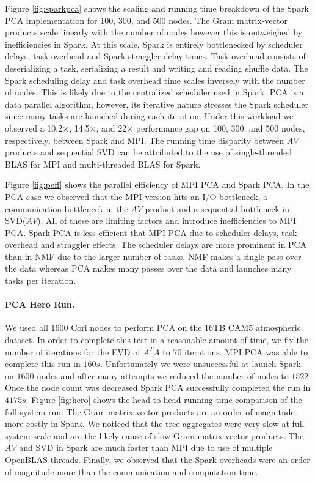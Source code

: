 Figure \ref{fig:sparkpca} shows the scaling and running time breakdown of the Spark PCA implementation for 100, 300, and 500 nodes. The Gram matrix-vector products scale linearly with the number of nodes however this is outweighed by inefficiencies in Spark. At this scale, Spark is entirely bottlenecked by scheduler delays, task overhead and Spark straggler delay times. Task overhead consists of deserializing a task, serializing a result and writing and reading shuffle data. The Spark scheduling delay and task overhead time scales inversely with the number of nodes. This is likely due to the centralized scheduler used in Spark. PCA is a data parallel algorithm, however, its iterative nature stresses the Spark scheduler since many tasks are launched during each iteration. Under this workload we observed a 10.2$\times$, 14.5$\times$, and 22$\times$ performance gap on 100, 300, and 500 nodes, respectively, between Spark and MPI. The running time disparity between $AV$ products and sequential SVD can be attributed to the use of single-threaded BLAS for MPI and multi-threaded BLAS for Spark.

Figure \ref{fig:peff} shows the parallel efficiency of MPI PCA and Spark PCA. In the PCA case we observed that the MPI version hits an I/O bottleneck, a communication bottleneck in the $AV$ product and a sequential bottleneck in SVD($AV$). All of these are limiting factors and introduce inefficiencies to MPI PCA. Spark PCA is less efficient that MPI PCA due to scheduler delays, task overhead and straggler effects. The scheduler delays are more prominent in PCA than in NMF due to the larger number of tasks. NMF makes a single pass over the data whereas PCA makes many passes over the data and launches many tasks per iteration.

\paragraph{PCA Hero Run.}
We used all 1600 Cori nodes to perform PCA on the 16TB CAM5 atmospheric dataset. In order to complete this test in a reasonable amount of time, we fix  the number of iterations for the EVD of $A^TA$ to $70$ iterations. MPI PCA was able to complete this run in $160s$. Unfortunately we were unsuccessful at launch Spark on $1600$ nodes and after many attempts we reduced the number of nodes to $1522$. Once the node count was decreased Spark PCA successfully completed the run in $4175s$. Figure \ref{fig:hero} shows the head-to-head running time comparison of the full-system run. The Gram matrix-vector products are an order of magnitude more costly in Spark. We noticed that the tree-aggregates were very slow at full-system scale and are the likely cause of slow Gram matrix-vector products. The $AV$ and SVD in Spark are much faster than MPI due to use of multiple OpenBLAS threads. Finally, we observed that the Spark overheads were an order of magnitude more than the communication and computation time.

